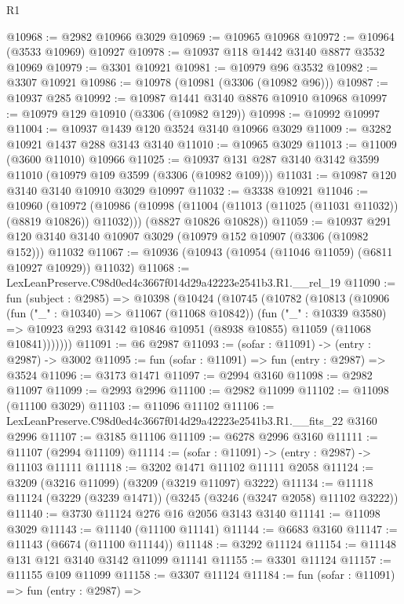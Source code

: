 \begin{lexlean}{R1}
\begin{coremodule}
@10968 := @2982 @10966 @3029
@10969 := @10965 @10968
@10972 := @10964 (@3533 @10969) @10927
@10978 := @10937 @118 @1442 @3140 @8877 @3532 @10969
@10979 := @3301 @10921
@10981 := @10979 @96 @3532
@10982 := @3307 @10921
@10986 := @10978 (@10981 (@3306 (@10982 @96)))
@10987 := @10937 @285
@10992 := @10987 @1441 @3140 @8876 @10910 @10968
@10997 := @10979 @129 @10910 (@3306 (@10982 @129))
@10998 := @10992 @10997
@11004 := @10937 @1439 @120 @3524 @3140 @10966 @3029
@11009 := @3282 @10921 @1437 @288 @3143 @3140
@11010 := @10965 @3029
@11013 := @11009 (@3600 @11010) @10966
@11025 := @10937 @131 @287 @3140 @3142 @3599 @11010 (@10979 @109 @3599 (@3306 (@10982 @109)))
@11031 := @10987 @120 @3140 @3140 @10910 @3029 @10997
@11032 := @3338 @10921
@11046 := @10960
    (@10972
      (@10986 (@10998 (@11004 (@11013 (@11025 (@11031 @11032)) (@8819 @10826)) @11032)))
      (@8827 @10826 @10828))
@11059 := @10937
    @291
    @120
    @3140
    @3140
    @10907
    @3029
    (@10979 @152 @10907 (@3306 (@10982 @152)))
    @11032
@11067 := @10936 (@10943 (@10954 (@11046 @11059) (@6811 @10927 @10929)) @11032)
@11068 := LexLeanPreserve.C98d0ed4c3667f014d29a42223e2541b3.R1.__rel_19
@11090 := fun (subject : @2985) =>
  @10398
    (@10424
      (@10745
        (@10782
          (@10813
            (@10906
              (fun ("_" : @10340) => @11067 (@11068 @10842))
              (fun ("_" : @10339 @3580) =>
              @10923 @293 @3142 @10846 @10951 (@8938 @10855) @11059 (@11068 @10841)))))))
@11091 := @6 @2987
@11093 := (sofar : @11091) -> (entry : @2987) -> @3002
@11095 := fun (sofar : @11091) => fun (entry : @2987) => @3524
@11096 := @3173 @1471
@11097 := @2994 @3160
@11098 := @2982 @11097
@11099 := @2993 @2996
@11100 := @2982 @11099
@11102 := @11098 (@11100 @3029)
@11103 := @11096 @11102
@11106 := LexLeanPreserve.C98d0ed4c3667f014d29a42223e2541b3.R1.__fits_22 @3160 @2996
@11107 := @3185 @11106
@11109 := @6278 @2996 @3160
@11111 := @11107 (@2994 @11109)
@11114 := (sofar : @11091) -> (entry : @2987) -> @11103 @11111
@11118 := @3202 @1471 @11102 @11111 @2058
@11124 := @3209 (@3216 @11099) (@3209 (@3219 @11097) @3222)
@11134 := @11118 @11124 (@3229 (@3239 @1471)) (@3245 (@3246 (@3247 @2058) @11102 @3222))
@11140 := @3730 @11124 @276 @16 @2056 @3143 @3140
@11141 := @11098 @3029
@11143 := @11140 (@11100 @11141)
@11144 := @6683 @3160
@11147 := @11143 (@6674 (@11100 @11144))
@11148 := @3292 @11124
@11154 := @11148 @131 @121 @3140 @3142 @11099 @11141
@11155 := @3301 @11124
@11157 := @11155 @109 @11099
@11158 := @3307 @11124
@11184 := fun (sofar : @11091) =>
  fun (entry : @2987) =>

\end{coremodule}
\end{lexlean}
